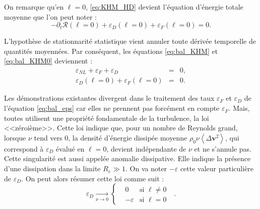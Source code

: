 On remarque qu'en $\boldsymbol{\ell} = 0$, \eqref{eq:KHM_HD} devient l'équation d'énergie totale moyenne que l'on peut noter : 
\begin{equation}
     \label{eq:bal_KHM0} -  \partial_t \mathcal{R}(\boldsymbol{\ell} =0)  + \varepsilon_{D}(\boldsymbol{\ell} =0) +  \varepsilon_{F}(\boldsymbol{\ell} =0) = 0  
.\end{equation} 

L'hypothèse de stationnarité statistique vient annuler toute dérivée temporelle de quantités moyennées. Par conséquent, les équations \eqref{eq:bal_KHM} et \eqref{eq:bal_KHM0} deviennent :  
\begin{eqnarray}
    \label{eq:bal_eps}\varepsilon_{NL} + \varepsilon_{F} + \varepsilon_{D} &=& 0 ,\\
    \label{eq:bal_eps0} \varepsilon_{D}(\boldsymbol{\ell} =0) +  \varepsilon_{F}(\boldsymbol{\ell} =0) &=& 0
.\end{eqnarray}


Les démonstrations existantes divergent dans le traitement des taux $\varepsilon_{F}$ et $\varepsilon_{D}$ de l'équation \eqref{eq:bal_eps} car elles ne prennent pas forcément en compte $\varepsilon_{F}$. Mais, toutes utilisent une propriété fondamentale de la turbulence, la loi <<zéroième>>. Cette loi indique que, pour un nombre de Reynolds grand, lorsque $\nu$ tend vers 0, la densité d'énergie dissipée moyenne $\rho_0 \nu  \left<\Delta\boldsymbol{v}^2\right>$, qui correspond à  $\varepsilon_D$ évalué en $\boldsymbol{\ell} =0$, devient indépendante de $\nu$ et ne s'annule pas. Cette singularité est aussi appelée anomalie dissipative. Elle indique la présence d'une dissipation dans la limite $R_e \gg 1$. On va noter $-\varepsilon$ cette valeur particulière de  $\varepsilon_D$. On peut alors résumer cette loi comme suit : 
\begin{equation}
 \label{eq:zero}  \varepsilon_D  \xrightarrow[\nu \rightarrow 0]{} \left\{
    \begin{split}
    & 0 & \textrm{si $\boldsymbol{\ell} \neq 0$ } \\
& - \varepsilon &  \textrm{si $\boldsymbol{\ell} =0$ } 
\end{split}
\right. .
\end{equation}

